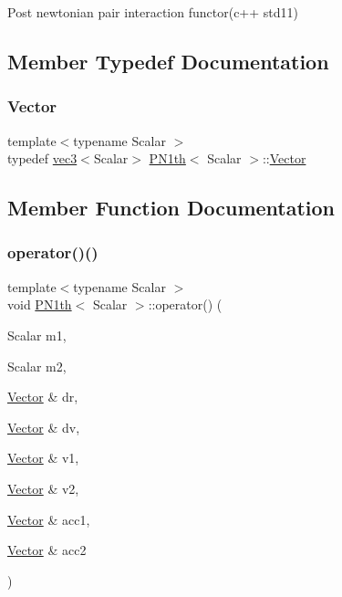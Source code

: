 Post newtonian pair interaction functor(c++ std11) 

\subsection{Member Typedef Documentation}
\mbox{\label{class_p_n1th_affb0517b66197be4e03c50d632f35c3f}} 
\subsubsection{\texorpdfstring{Vector}{Vector}}
{\footnotesize\ttfamily template$<$typename Scalar $>$ \\
typedef \mbox{\hyperlink{structvec3}{vec3}}$<$Scalar$>$ \mbox{\hyperlink{class_p_n1th}{P\+N1th}}$<$ Scalar $>$\+::\mbox{\hyperlink{class_p_n1th_affb0517b66197be4e03c50d632f35c3f}{Vector}}\hspace{0.3cm}{\ttfamily [private]}}



\subsection{Member Function Documentation}
\mbox{\label{class_p_n1th_a1ed48e417256ef44bf6faa3e7c433b7e}} 
\subsubsection{\texorpdfstring{operator()()}{operator()()}}
{\footnotesize\ttfamily template$<$typename Scalar $>$ \\
void \mbox{\hyperlink{class_p_n1th}{P\+N1th}}$<$ Scalar $>$\+::operator() (\begin{DoxyParamCaption}\item[{Scalar}]{m1,  }\item[{Scalar}]{m2,  }\item[{\mbox{\hyperlink{class_p_n1th_affb0517b66197be4e03c50d632f35c3f}{Vector}} \&}]{dr,  }\item[{\mbox{\hyperlink{class_p_n1th_affb0517b66197be4e03c50d632f35c3f}{Vector}} \&}]{dv,  }\item[{\mbox{\hyperlink{class_p_n1th_affb0517b66197be4e03c50d632f35c3f}{Vector}} \&}]{v1,  }\item[{\mbox{\hyperlink{class_p_n1th_affb0517b66197be4e03c50d632f35c3f}{Vector}} \&}]{v2,  }\item[{\mbox{\hyperlink{class_p_n1th_affb0517b66197be4e03c50d632f35c3f}{Vector}} \&}]{acc1,  }\item[{\mbox{\hyperlink{class_p_n1th_affb0517b66197be4e03c50d632f35c3f}{Vector}} \&}]{acc2 }\end{DoxyParamCaption})\hspace{0.3cm}{\ttfamily [inline]}}



